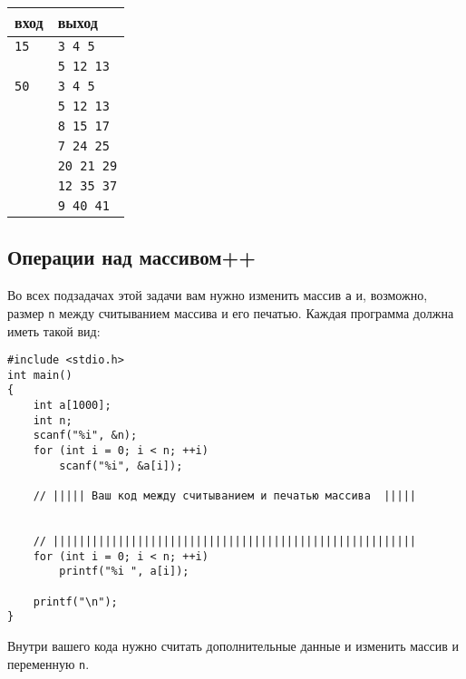 \documentclass{article}
\begin{document}
\begin{center}
\begin{tabular}{ l l }
 вход & выход \\ \hline
 \texttt{15}  & \texttt{3 4 5}  \\ 
              & \texttt{5 12 13}  \\ 
 \texttt{50}  & \texttt{3 4 5}  \\
              & \texttt{5 12 13}  \\ 
              & \texttt{8 15 17}  \\ 
              & \texttt{7 24 25}  \\ 
              & \texttt{20 21 29}  \\ 
              & \texttt{12 35 37}  \\ 
              & \texttt{9 40 41} 
\end{tabular}
\end{center}

\subsection{Операции над массивом++}
Во всех подзадачах этой задачи вам нужно изменить массив \texttt{a} и, возможно, размер \texttt{n} между считыванием массива и его печатью. Каждая программа должна иметь такой вид:
\begin{lstlisting}
#include <stdio.h>
int main() 
{
    int a[1000];
    int n;
    scanf("%i", &n);
    for (int i = 0; i < n; ++i)
        scanf("%i", &a[i]);

    // ||||| Ваш код между считыванием и печатью массива  |||||
    
    
    // ||||||||||||||||||||||||||||||||||||||||||||||||||||||||
    for (int i = 0; i < n; ++i)
        printf("%i ", a[i]);

    printf("\n");
}
\end{lstlisting}
Внутри вашего кода нужно считать дополнительные данные и изменить массив и переменную \texttt{n}.
\end{document}
